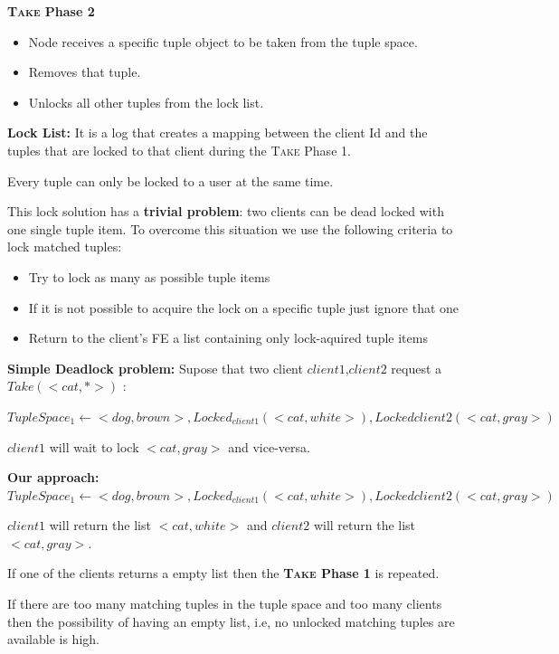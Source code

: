 \documentclass[times, 10pt,twocolumn]{article}
\begin{document}
\textbf{\textsc{Take} Phase 2}
\begin{itemize}
   \item Node receives a specific tuple object to be taken from the tuple space.
   \item Removes that tuple.
   \item Unlocks all other tuples from the lock list.
\end{itemize}

\textbf{Lock List:} It is a log that creates a mapping between the client Id and the
tuples that are locked to that client during the \textsc{Take} Phase 1.

Every tuple can only be locked to a user at the same time.

This lock solution has a \textbf{trivial problem}: two clients can be dead locked with one
single tuple item. To overcome this situation we use the following criteria to lock matched tuples:
\begin{itemize}
   \item Try to lock as many as possible tuple items
   \item If it is not possible to acquire the lock on a specific tuple just ignore that one
   \item Return to the client's FE a list containing only lock-aquired tuple items
\end{itemize}

\textbf{Simple Deadlock problem:}
Supose that two client $client1$,$client2$ request a $ Take(<cat, *>) $ :

$ TupleSpace_{1} \leftarrow <dog, brown>, Locked_{client1}(<cat, white>), Locked{client2}(<cat, gray>) $

$client1$ will wait to lock $<cat, gray>$ and vice-versa.

\textbf{Our approach:}
$ TupleSpace_{1} \leftarrow <dog, brown>, Locked_{client1}(<cat, white>), Locked{client2}(<cat, gray>) $

$client1$ will return the list $<cat, white>$ and $client2$ will return the list $<cat, gray>$.

If one of the clients returns a empty list then the \textbf{\textsc{Take} Phase 1} is repeated.

If there are too many matching tuples in the tuple space and too many clients then the possibility
of having an empty list, i.e, no unlocked matching tuples are available is high.
\end{document}
